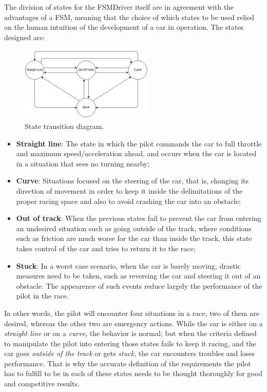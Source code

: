 	The division of states for the FSMDriver itself are in agreement with the advantages of a FSM, meaning that the choice of
	which states to be used relied on the human intuition of the development of a car in operation. The states designed are:

\begin{figure}[!t]
	\centering
	\includegraphics[width=2.5in]{StatesDiagram}
	\caption{State transition diagram.}
	\label{fig_sim}
\end{figure}

\begin{itemize}
	\item \textbf{Straight line}: The state in which the pilot commands the car to full throttle and maximum 
	speed/acceleration ahead, and occurs when the car is located in a situation that sees no turning nearby;
	
	\item \textbf{Curve}: Situations focused on the steering of the car, that is, changing its direction of movement
	in order to keep it inside the delimitations of the proper racing space and also to avoid crashing the car into
	an obstacle;
	
	\item \textbf{Out of track}: When the previous states fail to prevent the car from entering an undesired situation
	such as going outside of the track, where conditions such as friction are much worse for the car than inside the
	track, this state takes control of the car and tries to return it to the race;
	
	\item \textbf{Stuck}: In a worst case scenario, when the car is barely moving, drastic measures need to be taken,
	such as reversing the car and steering it out of an obstacle. The appearence of such events reduce largely the
	performance of the pilot in the race.
\end{itemize}

	In other words, the pilot will encounter four situations in a race, two of them are desired, whereas the other two are 
	emergency actions. While the car is either on a \emph{straight line} or on a \emph{curve}, the behavior is normal; 
	but when the criteria defined to manipulate the pilot into entering those states fails to keep it racing, and the car 
	goes \emph{outside of the track} or gets \emph{stuck}, the car encounters troubles and loses performance. That is why
	the accurate definition of the requirements the pilot has to fulfill to be in each of these states needs to be thought 
	thoroughly for good and competitive results.